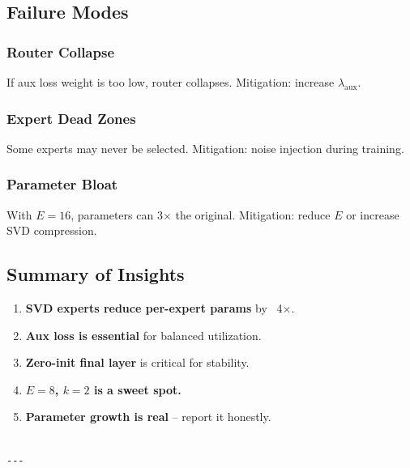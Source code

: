 \subsection{Failure Modes}

\subsubsection{Router Collapse}

If aux loss weight is too low, router collapses. Mitigation: increase 
$\lambda_\text{aux}$.

\subsubsection{Expert Dead Zones}

Some experts may never be selected. Mitigation: noise injection during 
training.

\subsubsection{Parameter Bloat}

With $E = 16$, parameters can 3$\times$ the original. Mitigation: reduce $E$ or 
increase SVD compression.

\subsection{Summary of Insights}

\begin{enumerate}
\item \textbf{SVD experts reduce per-expert params} by ~4$\times$.
\item \textbf{Aux loss is essential} for balanced utilization.
\item \textbf{Zero-init final layer} is critical for stability.
\item \textbf{$E = 8$, $k = 2$ is a sweet spot.}
\item \textbf{Parameter growth is real} -- report it honestly.
\end{enumerate}
\begin{lstlisting}

---
\end{lstlisting}